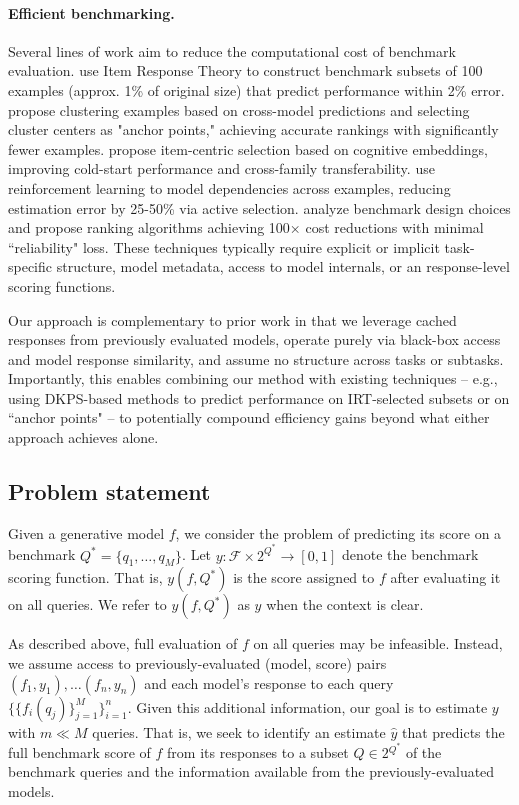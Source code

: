 \paragraph{Efficient benchmarking.}

Several lines of work aim to reduce the computational cost of benchmark evaluation.
\citet{polo2024tinybenchmarks} use Item Response Theory to construct benchmark subsets of 100 examples (approx. 1\% of original size) that predict performance within 2\% error.
\citet{vivek-etal-2024-anchor} propose clustering examples based on cross-model predictions and selecting cluster centers as "anchor points," achieving accurate rankings with significantly fewer examples.
\citet{bean2025scales} propose item-centric selection based on cognitive embeddings, improving cold-start performance and cross-family transferability.
\citet{li2024active} use reinforcement learning to model dependencies across examples, reducing estimation error by 25-50\% via active selection.
\citet{perlitz2024efficient} analyze benchmark design choices and propose ranking algorithms achieving 100× cost reductions with minimal ``reliability" loss.
These techniques typically require explicit or implicit task-specific structure, model metadata, access to model internals, or an response-level scoring functions.

Our approach is complementary to prior work in that we leverage cached responses from previously evaluated models, operate purely via black-box access and model response similarity, and assume no structure across tasks or subtasks. 
Importantly, this enables combining our method with existing techniques -- e.g., using DKPS-based methods to predict performance on IRT-selected subsets \citep{polo2024tinybenchmarks} or on  ``anchor points" \citep{vivek-etal-2024-anchor} -- to potentially compound efficiency gains beyond what either approach achieves alone.

\subsection{Problem statement}
Given a generative model $ f $, we consider the problem of predicting its score on a benchmark $ Q^{*} = \{q_{1}, \hdots, q_{M}\} $.
Let $ y: \mathcal{F} \times 2^{Q^{*}} \to [0,1] $ denote the benchmark scoring function.
That is, $ y(f, Q^{*}) $ is the score assigned to $ f $ after evaluating it on all queries.
We refer to $ y(f, Q^{*})$ as $ y $ when the context is clear.

As described above, full evaluation of $ f $ on all queries may be infeasible. 
Instead, we assume access to previously-evaluated (model, score) pairs $ (f_{1}, y_{1}), \hdots (f_{n}, y_{n}) $ and each model's response to each query $ \{\{f_{i}(q_{j})\}_{j=1}^{M}\}_{i=1}^{n} $.
Given this additional information, our goal is to estimate $ y $ with $ m \ll M $ queries.
That is, we seek to identify an estimate $ \hat{y} $ that predicts the full benchmark score of $
f $ from its responses to a subset $ Q \in 2{^{Q^*}} $ of the benchmark queries and the information available from the previously-evaluated models.